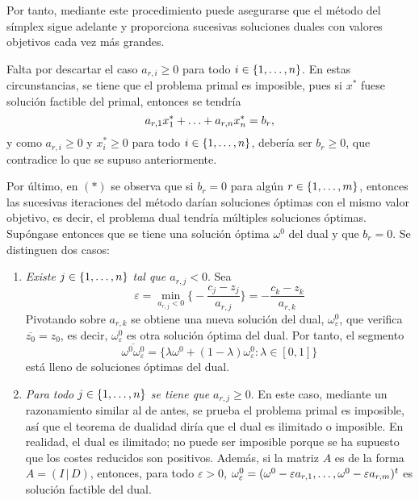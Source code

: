 \documentclass[11pt]{report}
\theoremstyle{mytheorem}
\theoremstyle{mydefinition}
\theoremstyle{myexample}
\begin{document}
Por tanto, mediante este procedimiento puede asegurarse que el método del símplex sigue adelante y proporciona sucesivas soluciones duales con valores objetivos cada vez más grandes.


    
Falta por descartar el caso $a_{r,i} \geq 0$ para todo $i \in \{1,\mathellipsis,n\}$. En estas circunstancias, se tiene que el problema primal es imposible, pues si $x^*$ fuese solución factible del primal, entonces se tendría
\[a_{r,1}x_1^*+\mathellipsis+a_{r,n}x_n^* = b_r,\]
y como $a_{r,i} \geq 0$ y $x_i^* \geq 0$ para todo $i \in \{1,\mathellipsis,n\}$, debería ser $b_r \geq 0$, que contradice lo que se supuso anteriormente.



Por último, en $(*)$ se observa que si $b_r = 0$ para algún $r \in \{1,\mathellipsis,m\}$, entonces las sucesivas iteraciones del método darían soluciones óptimas con el mismo valor objetivo, es decir, el problema dual tendría múltiples soluciones óptimas. Supóngase entonces que se tiene una solución óptima $\omega^0$ del dual y que $b_r = 0$. Se distinguen dos casos:

\begin{enumerate}
    \item \textit{Existe $j \in \{1,\mathellipsis,n\}$ tal que $a_{r,j} < 0$}. Sea
    \[\varepsilon = \min_{a_{r,j}<0} \biggl\{-\frac{c_j-z_j}{a_{r,j}}\biggr\} = -\frac{c_k-z_k}{a_{r,k}}\]
    Pivotando sobre $a_{r,k}$ se obtiene una nueva solución del dual, $\omega_\varepsilon^0$, que verifica $\overline{z_0} = z_0$, es decir, $\omega_\varepsilon^0$ es otra solución óptima del dual. Por tanto, el segmento
    \[\overline{\omega^0\omega^0_\varepsilon} = \{\lambda \omega^0 +(1-\lambda)\omega^0_\varepsilon \colon \lambda \in [0,1]\}\]
    está lleno de soluciones óptimas del dual.
    \item \textit{Para todo $j \in \{1,\mathellipsis,n\}$ se tiene que $a_{r,j} \geq 0$}. En este caso, mediante un razonamiento similar al de antes, se prueba el problema primal es imposible, así que el teorema de dualidad diría que el dual es ilimitado o imposible. En realidad, el dual es ilimitado; no puede ser imposible porque se ha supuesto que los costes reducidos son positivos. Además, si la matriz $A$ es de la forma $A = (I \, | \, D)$, entonces, para todo $\varepsilon>0$, $\omega^0_\varepsilon = (\omega^0-\varepsilon a_{r,1},\mathellipsis,\omega^0-\varepsilon a_{r,m})^t$ es solución factible del dual.
\end{enumerate}
\end{document}
